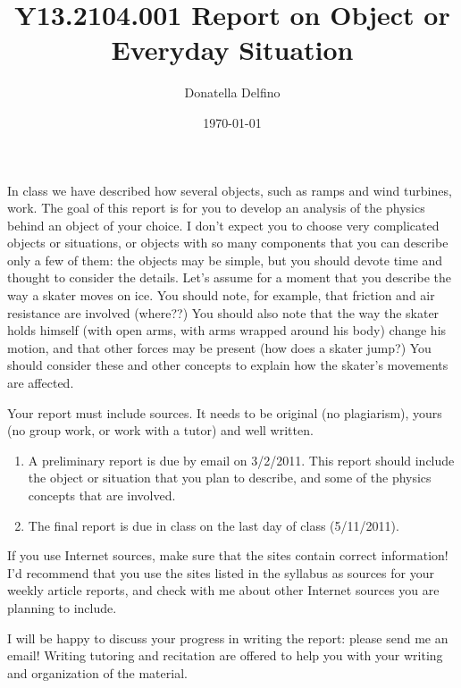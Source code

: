 \documentclass[12pt]{article}   %
\begin{document}
\title{Y13.2104.001 Report on Object or Everyday Situation}  
\author{Donatella Delfino}
\date{\today}

\maketitle

{}

In class we have described how several objects, such as ramps and wind turbines, work. The goal of this report is for you to develop an analysis of the physics behind an object of your choice. I don't expect you to choose very complicated objects or situations, or objects with so many components that you can describe only a few of them: the objects may be simple, but you should devote time and thought to consider the details. Let's assume for a moment that you describe the way a skater moves on ice. You should note, for example, that friction and air resistance are involved (where??) You should also note that the way the skater holds himself (with open arms, with arms wrapped around his body) change his motion, and that other forces may be present (how does a skater jump?) You should consider these and other concepts to explain how the skater's movements are affected.

Your report must include sources. It needs to be original (no plagiarism), yours (no group work, or work with a tutor) and well written.
\smallskip

{}
\begin{enumerate}
\item A preliminary report is due by email on 3/2/2011. This report should include the object or situation that you plan to describe, and some of the physics concepts that are involved. 
\item The final report is due in class on the last day of class (5/11/2011).
\end{enumerate}
\smallskip

{}
If you use Internet sources, make sure that the sites contain correct information! I'd recommend that you use the sites listed in the syllabus as sources for your weekly article reports, and check with me about other Internet sources you are planning to include.
\smallskip

{}
I will be happy to discuss your progress in writing the report: please send me an email! Writing tutoring and recitation are offered to help you with your writing and organization of the material.
\smallskip
\end{document}
